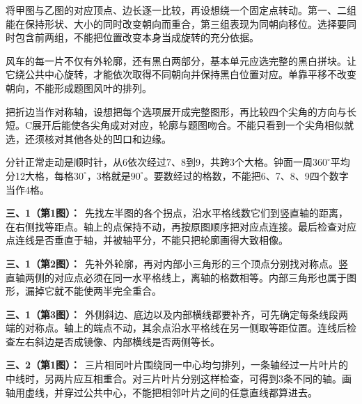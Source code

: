 \documentclass[multi=snippet,border=0pt]{standalone}
\newenvironment{snippet}[3]{\begin{minipage}{#1bp}\color{answerred}\fontsize{#2}{#3}\selectfont\raggedright}{\end{minipage}}
\begin{document}
\begin{snippet}{505}{11.5}{14}将甲图与乙图的对应顶点、边长逐一比较，再设想绕一个固定点转动。第一、二组能在保持形状、大小的同时改变朝向而重合，第三组表现为同朝向移位。选择要同时包含前两组，不能把位置改变本身当成旋转的充分依据。\end{snippet}
\begin{snippet}{505}{11.5}{14}风车的每一片不仅有外轮廓，还有黑白两部分，基本单元应选完整的黑白拼块。让它绕公共中心旋转，才能依次取得不同朝向并保持黑白位置对应。单靠平移不改变朝向，不能形成题图风叶的排列。\end{snippet}
\begin{snippet}{505}{11.5}{14}把折边当作对称轴，设想把每个选项展开成完整图形，再比较四个尖角的方向与长短。C展开后能使各尖角成对对应，轮廓与题图吻合。不能只看到一个尖角相似就选，还须核对其他各处的凹口和边缘。\end{snippet}
\begin{snippet}{505}{11.5}{14}分针正常走动是顺时针，从6依次经过7、8到9，共跨3个大格。钟面一周\(360^\circ\)平均分12大格，每格\(30^\circ\)，3格就是\(90^\circ\)。要数经过的格数，不能把6、7、8、9四个数字当作4格。\end{snippet}
\begin{snippet}{505}{11.5}{14}\textbf{三、1（第1图）：}\ 先找左半图的各个拐点，沿水平格线数它们到竖直轴的距离，在右侧找等距点。轴上的点保持不动，再按原图顺序把对应点连接。最后检查对应点连线是否垂直于轴，并被轴平分，不能只把轮廓画得大致相像。\end{snippet}
\begin{snippet}{505}{11.5}{14}\textbf{三、1（第2图）：}\ 先补外轮廓，再对内部小三角形的三个顶点分别找对称点。竖直轴两侧的对应点必须在同一水平格线上，离轴的格数相等。内部三角形也属于图形，漏掉它就不能使两半完全重合。\end{snippet}
\begin{snippet}{505}{11.5}{14}\textbf{三、1（第3图）：}\ 外侧斜边、底边以及内部横线都要补齐，可先确定每条线段两端的对称点。轴上的端点不动，其余点沿水平格线在另一侧取等距位置。连线后检查左右斜边是否成镜像、内部横线是否两侧等长。\end{snippet}
\begin{snippet}{505}{11.5}{14}\textbf{三、2（第1图）：}\ 三片相同叶片围绕同一中心均匀排列，一条轴经过一片叶片的中线时，另两片应互相重合。对三片叶片分别这样检查，可得到3条不同的轴。画轴用虚线，并穿过公共中心，不能把相邻叶片之间的任意直线都算进去。\end{snippet}
\end{document}
